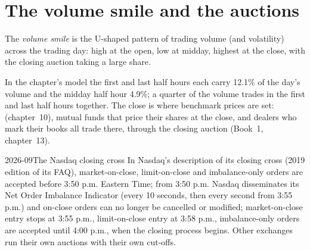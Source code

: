 \section{The volume smile and the auctions}

\begin{definition}\label{def:s1:intraday-patterns:smile}
The \emph{volume smile} is the U-shaped pattern of trading volume (and volatility) across the trading day: high at the open, low at
midday, highest at the close, with the closing auction taking a large share.
\end{definition}

In the chapter's model the first and last half hours each carry 12.1\% of the day's volume and the midday half hour 4.9\%; a quarter of the volume
trades in the first and last half hours together. The close is where benchmark prices are set:  (chapter~10), mutual funds that price their
shares at the close, and dealers who mark their books all trade there, through the closing auction (Book~1, chapter~13).

\begin{dated}{2026-09}{The Nasdaq closing cross}\label{dat:s1:intraday-patterns:nasdaq}
In Nasdaq's description of its closing cross (2019 edition of its FAQ), market-on-close, limit-on-close and imbalance-only orders are accepted before 3:50
p.m. Eastern Time; from 3:50 p.m. Nasdaq disseminates its Net Order Imbalance Indicator (every 10 seconds, then every second from 3:55 p.m.) and on-close
orders can no longer be cancelled or modified; market-on-close entry stops at 3:55 p.m., limit-on-close entry at 3:58 p.m., imbalance-only orders are
accepted until 4:00 p.m., when the closing process begins. Other exchanges run their own auctions with their own cut-offs.
\end{dated}

